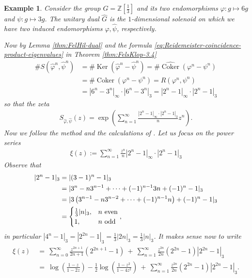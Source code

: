 \documentclass[oneside]{amsart}
\def\Z{\mathbb{Z}}
\def\Ker{\operatorname{Ker}}
\def\Coker{\operatorname{Coker}}
\newtheorem{ex}[thm]{Example}
\begin{document}
\begin{ex}
  Consider the group $G = \Z[\frac{1}{3}]$ and its two endomorphisms
  $\varphi: g \mapsto 6g$ and $\psi: g \mapsto 3g$.
  The unitary dual $\widehat{G}$ is the $1$-dimensional solenoid on which we have two induced
  endomorphisms $\widehat{\varphi}, \widehat{\psi}$, respectively.

  Now by {\rm Lemma \ref{thm:FelHil-dual}} and the formula \eqref{eq:Reidemeister-coincidence-product-eigenvalues}
  in {\rm Theorem \ref{thm:FelsKlop-3.4}}
  \begin{align*}
    \# S(\widehat{\varphi}^n, \widehat{\psi}^n)
    &= \# \Ker(\widehat{\varphi}^n - \widehat{\psi}^n)
    = \# \widehat{\Coker}(\varphi^n - \psi^n) \\
    &= \# \Coker(\varphi^n - \psi^n) = R(\varphi^n, \psi^n) \\
    &= |6^n - 3^n|_\infty \cdot |6^n - 3^n|_3 = |2^n - 1|_\infty \cdot |2^n - 1|_3
  \end{align*}
  so that the zeta
  \begin{align*}
    S_{\widehat{\varphi}, \widehat{\psi}}(z) = \exp \left( \sum_{n=1}^\infty \frac{|2^n-1|_\infty \cdot |2^n - 1|_3}{n} z^n \right).
  \end{align*}
  Now we follow the method and the calculations of \cite[Lemma~4.1]{EvStanWard}.
  Let us focus on the power series
  \begin{align*}
    \xi(z) := \sum_{n=1}^\infty \frac{z^n}{n} |2^n-1|_\infty \cdot |2^n-1|_3
  \end{align*}
  Observe that
  \begin{align*}
    |2^n - 1|_3 &= |(3-1)^n - 1|_3 \\
    &= |3^n - n3^{n-1} + \dots + (-1)^{n-1}3n + (-1)^n - 1|_3 \\
    &= |3\left(3^{n-1} - n3^{n-2} + \dots + (-1)^{n-1}n \right) + (-1)^n - 1|_3 \\
    &= \begin{cases}
      \frac{1}{3}|n|_3, & \text{$n$ {\rm even}} \\
      1, & \text{$n$ {\rm odd}}
    \end{cases},
  \end{align*}
  in particular $|4^n-1|_3 = |2^{2n}-1|_3 = \frac{1}{3}|2n|_3 = \frac{1}{3}|n|_3$.
  It makes sense now to write
  \begin{align} \label{eq:example-synchronization-zeta-xi}
  \begin{split}
    \xi(z) \ &= \ \sum_{n=0}^\infty \frac{z^{2n+1}}{2n+1}(2^{2n+1}-1) \
      + \ \sum_{n=1}^\infty \frac{z^{2n}}{2n} (2^{2n}-1)|2^{2n}-1|_3 \\
    &= \ \log \left( \frac{1-z}{1-2z} \right) - \frac{1}{2} \log \left( \frac{1-z^2}{1-4z^2} \right) \
      + \ \sum_{n=1}^\infty \frac{z^{2n}}{2n} (2^{2n}-1)|2^{2n}-1|_3.
  \end{split}
  \end{align}


\end{ex}
\end{document}
